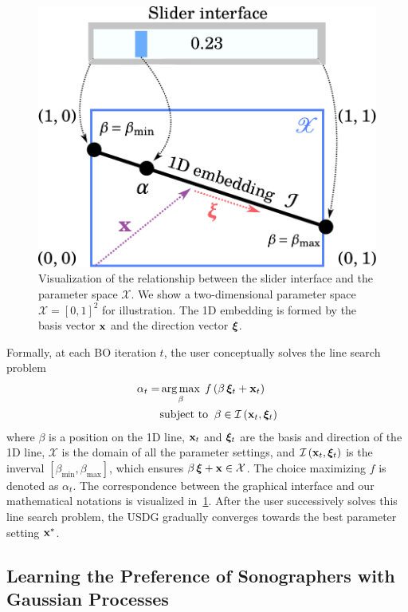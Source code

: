 \begin{figure}[t]
  \centering
  \includegraphics[scale=0.35]{figures/linesearch.pdf}
  \caption{Visualization of the relationship between the slider interface and the parameter space \(\mathcal{X}\).
    We show a two-dimensional parameter space \(\mathcal{X} = {[0, 1]}^2\) for illustration.
    The 1D embedding is formed by the basis vector \(\mathbf{x}\) and the direction vector \(\bm{\xi}\).
  }\label{fig:linesearch}
\end{figure}
%
Formally, at each BO iteration \(t\), the user conceptually solves the line search problem
\begin{align}
 \alpha_t = &\operatorname*{arg\,max}_{ \beta }\; f\,(\beta\,\bm{\xi}_t + \mathbf{x}_t) \label{eq:line_search}\\
 &\text{subject to}\;\; \beta \in \mathcal{I}\left(\mathbf{x}_t, \bm{\xi}_t\right) 
\end{align}
{\noindent}where \(\beta\) is a position on the 1D line, \(\mathbf{x}_t\) and \(\bm{\xi}_t\) are the basis and direction of the 1D line, \(\mathcal{X}\) is the domain of all the parameter settings, and \(\mathcal{I}\left(\mathbf{x}_t, \bm{\xi}_t\right)\) is the inverval \([\beta_{\mathrm{min}}, \beta_{\mathrm{max}}]\), which ensures \(\beta\,\bm{\xi} + \mathbf{x}  \in \mathcal{X}\).
The choice maximizing \(f\) is denoted as \(\alpha_t\).
The correspondence between the graphical interface and our mathematical notations is visualized in~\cref{fig:linesearch}.
After the user successively solves this line search problem, the USDG gradually converges towards the best parameter setting \(\mathbf{x}^{*}\).

\subsection{Learning the Preference of Sonographers with Gaussian Processes}\label{section:gp}
